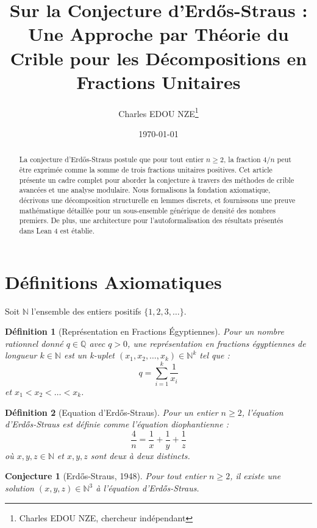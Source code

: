 \documentclass[11pt,a4paper]{article}
\title{Sur la Conjecture d'Erd\H{o}s-Straus : Une Approche par Th\'eorie du Crible pour les D\'ecompositions en Fractions Unitaires}
\author{Charles EDOU NZE\thanks{Charles EDOU NZE, chercheur ind\'ependant}}
\date{\today}
\newtheorem{definition}{D\'efinition}
\newtheorem{conjecture}{Conjecture}
\begin{document}
\maketitle

\begin{abstract}
La conjecture d'Erd\H{o}s-Straus postule que pour tout entier $n \geq 2$, la fraction $4/n$ peut \^etre exprim\'ee comme la somme de trois fractions unitaires positives. Cet article pr\'esente un cadre complet pour aborder la conjecture \`a travers des m\'ethodes de crible avanc\'ees et une analyse modulaire. Nous formalisons la fondation axiomatique, d\'ecrivons une d\'ecomposition structurelle en lemmes discrets, et fournissons une preuve math\'ematique d\'etaill\'ee pour un sous-ensemble g\'en\'erique de densit\'e des nombres premiers. De plus, une architecture pour l'autoformalisation des r\'esultats pr\'esent\'es dans Lean 4 est \'etablie.
\end{abstract}

\tableofcontents
\newpage

\section{D\'efinitions Axiomatiques}

Soit $\mathbb{N}$ l'ensemble des entiers positifs $\{1, 2, 3, \ldots \}$.

\begin{definition}[Repr\'esentation en Fractions \'Egyptiennes]
Pour un nombre rationnel donn\'e $q \in \mathbb{Q}$ avec $q > 0$, une repr\'esentation en fractions \'egyptiennes de longueur $k \in \mathbb{N}$ est un k-uplet $(x_1, x_2, \dots, x_k) \in \mathbb{N}^k$ tel que :
\begin{equation}
q = \sum_{i=1}^k \frac{1}{x_i}
\end{equation}
et $x_1 < x_2 < \dots < x_k$.
\end{definition}

\begin{definition}[Equation d'Erd\H{o}s-Straus]
Pour un entier $n \geq 2$, l'\'equation d'Erd\H{o}s-Straus est d\'efinie comme l'\'equation diophantienne :
\begin{equation}
\frac{4}{n} = \frac{1}{x} + \frac{1}{y} + \frac{1}{z}
\end{equation}
o\`u $x, y, z \in \mathbb{N}$ et $x, y, z$ sont deux \`a deux distincts.
\end{definition}

\begin{conjecture}[Erd\H{o}s-Straus, 1948]
Pour tout entier $n \ge 2$, il existe une solution $(x, y, z) \in \mathbb{N}^3$ \`a l'\'equation d'Erd\H{o}s-Straus.
\end{conjecture}
\end{document}
